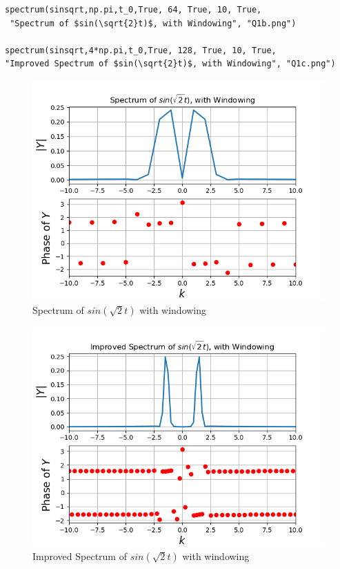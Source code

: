 \documentclass[12pt, a4paper]{report}
\begin{document}
 \begin{Verbatim}
spectrum(sinsqrt,np.pi,t_0,True, 64, True, 10, True,
 "Spectrum of $sin(\sqrt{2}t)$, with Windowing", "Q1b.png")

spectrum(sinsqrt,4*np.pi,t_0,True, 128, True, 10, True, 
"Improved Spectrum of $sin(\sqrt{2}t)$, with Windowing", "Q1c.png")  
 \end{Verbatim}

 \begin{figure}[!tbh]
   	\centering
   	\includegraphics[scale=0.7]{Q1b.png}
	\caption{Spectrum of $sin(\sqrt{2}t)$ with windowing}
 \end{figure} 
  \begin{figure}[!tbh]
   	\centering
   	\includegraphics[scale=0.7]{Q1c.png}
	\caption{Improved Spectrum of $sin(\sqrt{2}t)$ with windowing}
 \end{figure} 
\newpage
\end{document}
